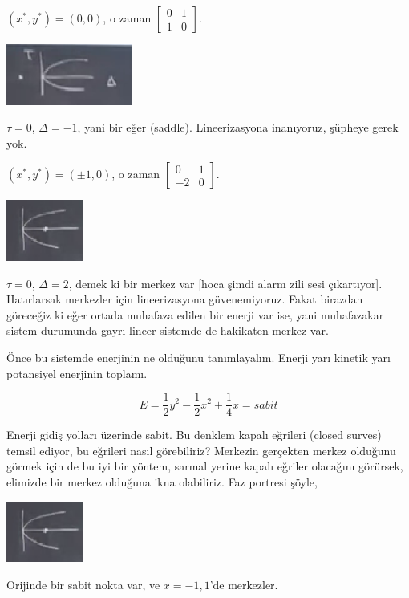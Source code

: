 \documentclass[12pt,fleqn]{article}\usepackage{../../common}
\begin{document}
$(x^*,y^*) = (0,0)$, o zaman $\left[\begin{array}{rr} 0 & 1 \\ 1 & 0\end{array}\right]$.

\includegraphics[height=2cm]{07_02.png}

$\tau=0$, $\Delta = -1$, yani bir eğer (saddle). Lineerizasyona inanıyoruz,
şüpheye gerek yok.

$(x^*,y^*) = (\pm 1,0)$, o zaman $\left[\begin{array}{rr} 0 & 1 \\ -2 & 0\end{array}\right]$.

\includegraphics[height=2cm]{07_03.png}

$\tau=0$, $\Delta = 2$, demek ki bir merkez var [hoca şimdi alarm zili sesi
çıkartıyor]. Hatırlarsak merkezler için lineerizasyona güvenemiyoruz. Fakat
birazdan göreceğiz ki eğer ortada muhafaza edilen bir enerji var ise, yani
muhafazakar sistem durumunda gayrı lineer sistemde de hakikaten merkez var.

Önce bu sistemde enerjinin ne olduğunu tanımlayalım. Enerji yarı kinetik yarı
potansiyel enerjinin toplamı. 

$$ E = \frac{1}{2}y^2 - \frac{1}{2}x^2 + \frac{1}{4}x = sabit $$

Enerji gidiş yolları üzerinde sabit. Bu denklem kapalı eğrileri (closed surves)
temsil ediyor, bu eğrileri nasıl görebiliriz? Merkezin gerçekten merkez olduğunu
görmek için de bu iyi bir yöntem, sarmal yerine kapalı eğriler olacağını
görürsek, elimizde bir merkez olduğuna ikna olabiliriz. Faz portresi şöyle,

\includegraphics[height=2cm]{07_03.png}

Orijinde bir sabit nokta var, ve $x=-1,1$'de merkezler.
\end{document}
